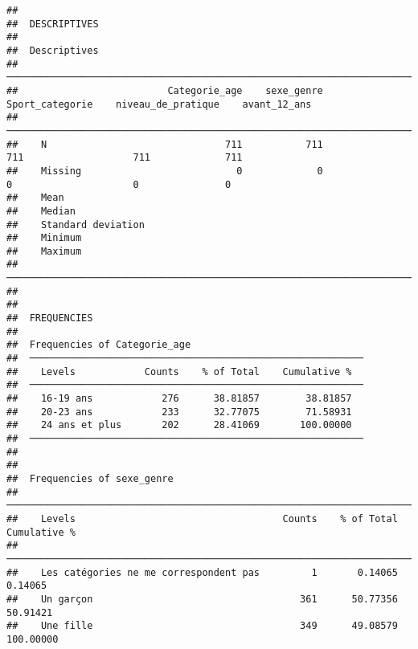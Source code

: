 \documentclass[
]{article}
\begin{document}
\begin{verbatim}
## 
##  DESCRIPTIVES
## 
##  Descriptives                                                                                                   
##  ────────────────────────────────────────────────────────────────────────────────────────────────────────────── 
##                          Categorie_age    sexe_genre    Sport_categorie    niveau_de_pratique    avant_12_ans   
##  ────────────────────────────────────────────────────────────────────────────────────────────────────────────── 
##    N                               711           711                711                   711             711   
##    Missing                           0             0                  0                     0               0   
##    Mean                                                                                                         
##    Median                                                                                                       
##    Standard deviation                                                                                           
##    Minimum                                                                                                      
##    Maximum                                                                                                      
##  ────────────────────────────────────────────────────────────────────────────────────────────────────────────── 
## 
## 
##  FREQUENCIES
## 
##  Frequencies of Categorie_age                               
##  ────────────────────────────────────────────────────────── 
##    Levels            Counts    % of Total    Cumulative %   
##  ────────────────────────────────────────────────────────── 
##    16-19 ans            276      38.81857        38.81857   
##    20-23 ans            233      32.77075        71.58931   
##    24 ans et plus       202      28.41069       100.00000   
##  ────────────────────────────────────────────────────────── 
## 
## 
##  Frequencies of sexe_genre                                                          
##  ────────────────────────────────────────────────────────────────────────────────── 
##    Levels                                    Counts    % of Total    Cumulative %   
##  ────────────────────────────────────────────────────────────────────────────────── 
##    Les catégories ne me correspondent pas         1       0.14065         0.14065   
##    Un garçon                                    361      50.77356        50.91421   
##    Une fille                                    349      49.08579       100.00000   

\end{verbatim}
\end{document}
